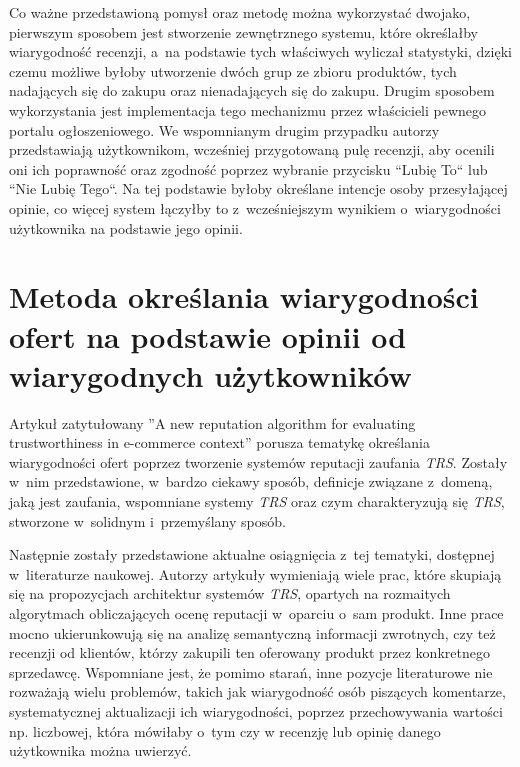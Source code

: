 \documentclass[../Kamil_Kowalewski_Main.tex]{subfiles}
\begin{document}
{{        Co ważne przedstawioną pomysł oraz metodę można wykorzystać dwojako, pierwszym
        sposobem jest stworzenie zewnętrznego systemu, które określałby wiarygodność
        recenzji, a~na podstawie tych właściwych wyliczał statystyki, dzięki czemu
        możliwe byłoby utworzenie dwóch grup ze zbioru produktów, tych nadających się
        do zakupu oraz nienadających się do zakupu. Drugim sposobem wykorzystania jest
        implementacja tego mechanizmu przez właścicieli pewnego portalu ogłoszeniowego.
        We wspomnianym drugim przypadku autorzy przedstawiają użytkownikom, wcześniej
        przygotowaną pulę recenzji, aby ocenili oni ich poprawność oraz zgodność poprzez
        wybranie przycisku ``Lubię To`` lub ``Nie Lubię Tego``. Na tej podstawie byłoby
        określane intencje osoby przesyłającej opinie, co więcej system łączyłby to
        z~wcześniejszym wynikiem o~wiarygodności użytkownika na podstawie jego opinii.
    }

    \section{Metoda określania wiarygodności ofert na podstawie opinii od wiarygodnych użytkowników}
    \label{chapter2:przeglad_literatury:artykul_2} {
        Artykuł zatytułowany ''A new reputation algorithm for evaluating
        trustworthiness in e-commerce
        context''\cite{article:evaluating_trustworthiness_2013} porusza tematykę
        określania wiarygodności ofert poprzez tworzenie systemów reputacji zaufania
        \textit{TRS}. Zostały w~nim przedstawione, w~bardzo ciekawy sposób, definicje
        związane z~domeną, jaką jest zaufania, wspomniane systemy \textit{TRS} oraz czym
        charakteryzują się \textit{TRS}, stworzone w~solidnym i~przemyślany sposób.

        Następnie zostały przedstawione aktualne osiągnięcia z~tej tematyki, dostępnej
        w~literaturze naukowej. Autorzy artykuły wymieniają wiele prac, które skupiają
        się na propozycjach architektur systemów \textit{TRS}, opartych na rozmaitych
        algorytmach obliczających ocenę reputacji w~oparciu o~sam produkt. Inne prace
        mocno ukierunkowują się na analizę semantyczną informacji zwrotnych, czy też
        recenzji od klientów, którzy zakupili ten oferowany produkt przez konkretnego
        sprzedawcę. Wspomniane jest, że pomimo starań, inne pozycje literaturowe nie
        rozważają wielu problemów, takich jak wiarygodność osób piszących komentarze,
        systematycznej aktualizacji ich wiarygodności, poprzez przechowywania wartości
        np. liczbowej, która mówiłaby o~tym czy w recenzję lub opinię danego użytkownika
        można uwierzyć.

}}
\end{document}
